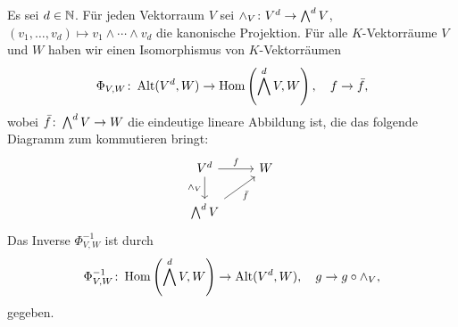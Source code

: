 \section{}

Es sei $d \in \mathbb{N}$.
Für jeden Vektorraum $V$ sei $\wedge_V \colon V^d \to \bigwedge^{d} V$, $(v_1, \dotsc, v_d) \mapsto v_1 \wedge \dotsb \wedge v_d$ die kanonische Projektion.
Für alle $K$-Vektorräume $V$ und $W$ haben wir einen Isomorphismus von $K$-Vektorräumen
\[
          \Phi_{V, W}
  \colon  \operatorname{Alt}( V^d, W )
  \to     \operatorname{Hom}\left( \bigwedge^{d} V, W \right),
  \quad   f
  \to     \bar{f},
\]
wobei $\bar{f} \colon \bigwedge^{d} V \to W$ die eindeutige lineare Abbildung ist, die das folgende Diagramm zum kommutieren bringt:
\[
  \begin{tikzcd}
      V^d
      \arrow{r}{f}
      \arrow[swap]{d}{\wedge_V}
    & W
    \\
      \exteriorpower{d}{V}
      \arrow[swap]{ru}{\induced{f}}
    & {}
  \end{tikzcd}
\]
Das Inverse $\Phi_{V,W}^{-1}$ ist durch
\[
          \Phi_{V, W}^{-1}
  \colon  \operatorname{Hom}\left( \bigwedge^{d} V, W \right)
  \to     \operatorname{Alt}( V^d, W ),
  \quad   g
  \to     g \circ \wedge_V,
\]
gegeben.

